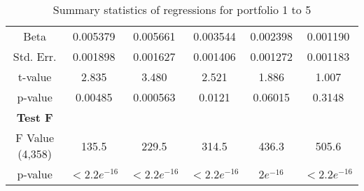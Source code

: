 \documentclass[11pt]{article}
\begin{document}
\begin{table}[H]
\begin{tabular}{cccccc}
    Beta & 0.005379 & 0.005661  &  0.003544 &  0.002398 & 0.001190 \\
    Std. Err. & 0.001898 & 0.001627 &  0.001406  & 0.001272 & 0.001183 \\
    t-value & 2.835 &3.480 & 2.521 & 1.886 & 1.007 \\
    p-value & 0.00485 & 0.000563 & 0.0121 & 0.06015 & 0.3148 \\
    \midrule
    \textbf{Test F}  \\
    F Value (4,358) & 135.5 & 229.5 & 314.5 & 436.3 & 505.6 \\
    p-value & $< 2.2e^{-16}$ & $< 2.2e^{-16}$ & $< 2.2e^{-16}$ & $2e^{-16}$ & $< 2.2e^{-16}$ \\
    \bottomrule
    \bottomrule
    \end{tabular}
    \caption{Summary statistics of regressions for portfolio 1 to 5} 
    \label{tab:summary_reg1_5}
\end{table}
\end{document}
